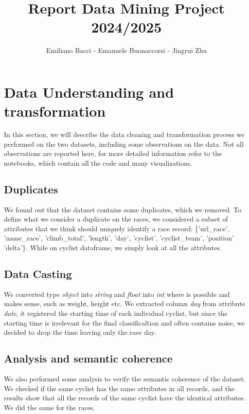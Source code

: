 \documentclass{article}
\title{Report Data Mining Project 2024/2025}
\author{Emiliano Bacci - Emanuele Buonaccorsi - Jingrui Zhu}
\begin{document}
\maketitle

\section{Data Understanding and transformation}
In this section, we will describe the data cleaning and transformation process we performed on the two datasets, including some observations on the data.
Not all observations are reported here, for more detailed information refer to the notebooks, which contain all the code and many visualizations.

\subsection{Duplicates}

We found out that the dataset contains some duplicates, which we removed.
To define what we consider a duplicate on the races, we considered a subset of attributes that we think should uniquely identify a race record: \{'url\_race', 'name\_race', 'climb\_total', 'length', 'day', 'cyclist', 'cyclist\_team', 'position' 'delta'\}. While on cyclist dataframe, we simply look at all the attributes.

\subsection{Data Casting}
We converted type \emph{object} into \emph{string} and \emph{float} into \emph{int} where is possible and makes sense, such as weight, height etc. We extracted column \emph{day} from attribute \emph{date}, it registered the starting time of each individual cyclist, but since the starting time is irrelevant for the final classificaltion and often contains noise, we decided to drop the time leaving only the race day.


\subsection{Analysis and semantic coherence}


We also performed some analysis to verify the semantic coherence of the dataset.
We checked if the same cyclist has the same attributes in all records, and the results show that all the records of the same cyclist have the identical attributes. We did the same for the races.
\end{document}
